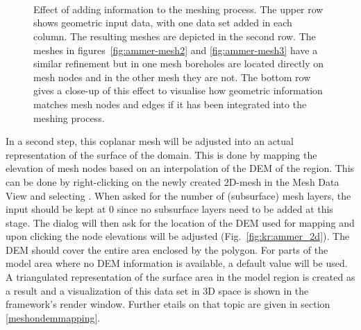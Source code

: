 \begin{figure}[!h]
\begin{center}
\enspace
{}\enspace
{}\\
\enspace
{}\enspace
{}\\
\enspace
{}\enspace
{}\\
\end{center}
\caption{Effect of adding information to the meshing process. The upper row shows geometric input data, with one data set added in each column. The resulting meshes are depicted in the second row. The meshes in figures~\ref{fig:ammer-mesh2} and \ref{fig:ammer-mesh3} have a similar refinement but in one mesh boreholes are located directly on mesh nodes and in the other mesh they are not. The bottom row gives a close-up of this effect to visualise how geometric information matches mesh nodes and edges if it has been integrated into the meshing process.\label{fig:workflow:2Dmesh}}
\end{figure}

In a second step, this coplanar mesh will be adjusted into an actual representation of the surface of the domain. This is done by mapping the elevation of mesh nodes based on an interpolation of the DEM of the region.  This can be done by right-clicking on the newly created 2D-mesh in the Mesh Data View and selecting . When asked for the number of (subsurface) mesh layers, the input should be kept at $0$ since no subsurface layers need to be added at this stage. The dialog will then ask for the location of the DEM used for mapping and upon clicking  the node elevations will be adjusted (Fig.~\ref{fig:kr:ammer_2d}). The DEM should cover the entire area enclosed by the polygon. For parts of the model area where no DEM information is available, a default value will be used. A triangulated representation of the surface area in the model region is created as a result and a visualization of this data set in 3D space is shown in the framework's render window. Further etails on that topic are given in section \ref{meshondemmapping}.


